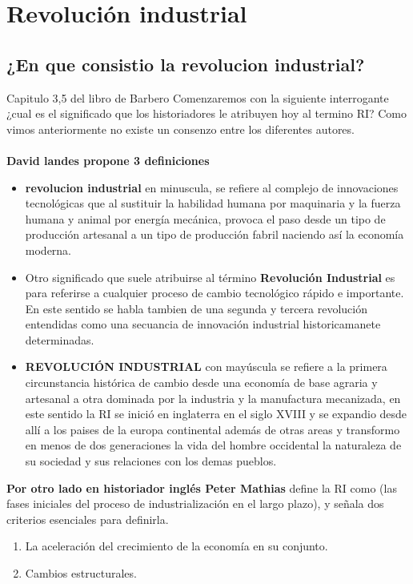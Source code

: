 \documentclass[12pt]{book}
\begin{document}
\tableofcontents
\chapter{Revoluci\'on industrial}
\section{¿En que consistio la revolucion industrial?}
Capitulo 3,5 del libro de Barbero
 Comenzaremos con la siguiente interrogante ¿cual es el significado que los historiadores le atribuyen hoy al termino RI? Como vimos anteriormente no existe un consenzo entre los diferentes autores.
 \\
\\
\textbf{David landes propone 3 definiciones}
\begin{itemize}
 \item \textbf{revolucion industrial} en minuscula, se refiere al complejo de innovaciones tecnol\'ogicas que al sustituir la habilidad humana por maquinaria y la fuerza humana y animal por energ\'ia mec\'anica, provoca el paso desde un tipo de producci\'on artesanal a un tipo de producci\'on fabril naciendo as\'i la econom\'ia moderna.
 \item Otro significado que suele atribuirse al t\'ermino \textbf{Revoluci\'on Industrial}  es para referirse a cualquier proceso de cambio tecnol\'ogico r\'apido e importante.	En este sentido se habla tambien de una segunda y tercera revoluci\'on entendidas como una secuancia de innovaci\'on industrial historicamanete determinadas.
 \item \textbf{REVOLUCI\'ON INDUSTRIAL} con may\'uscula se refiere a la primera circunstancia hist\'orica de cambio desde una econom\'ia de base agraria y artesanal a otra dominada por la industria y la manufactura mecanizada, en este sentido la RI se inici\'o en inglaterra en el siglo XVIII y se expandio desde all\'i a los paises de la europa continental adem\'as de otras areas y transformo en menos de dos generaciones la vida del hombre occidental la naturaleza de su sociedad y sus relaciones con los demas pueblos.
 \end{itemize} 
\textbf{Por otro lado en historiador ingl\'es Peter Mathias} define la RI como (las fases iniciales del proceso de industrializaci\'on en el largo plazo), y señala dos criterios esenciales para definirla.
\begin{enumerate}
\item La aceleraci\'on del crecimiento de la econom\'ia en su conjunto.
\item Cambios estructurales.
\end{enumerate}
\end{document}
